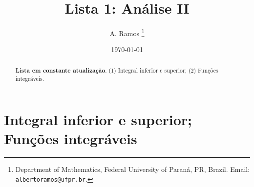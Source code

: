 \documentclass{article}
\theoremstyle{plain}
\theoremstyle{definition}
\theoremstyle{remark}
\begin{document}
\title{Lista 1: Análise II}

\author{
A. Ramos \thanks{Department of Mathematics,
    Federal University of Paraná, PR, Brazil.
    Email: {\tt albertoramos@ufpr.br}.}
}

\date{\today}
 
\maketitle

\begin{abstract}
{\bf Lista em constante atualização}.
(1) Integral inferior e superior; (2) Funções integráveis. 
\end{abstract}


\section{Integral inferior e superior; Funções integráveis} 
\end{document}
